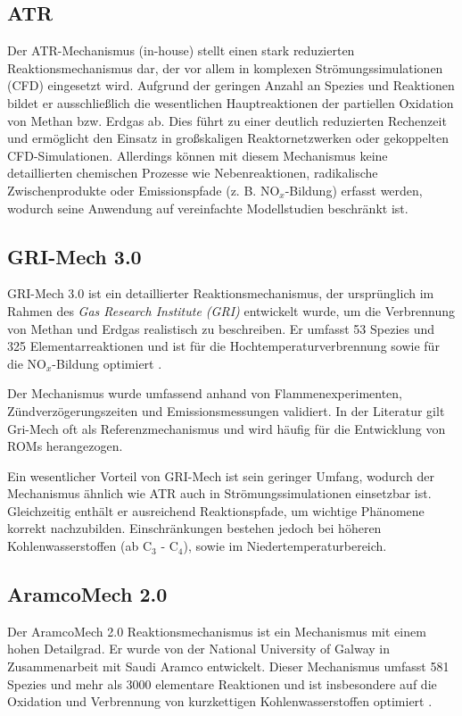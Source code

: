     \subsection*{ATR}
        Der ATR-Mechanismus (in-house) stellt einen stark reduzierten Reaktionsmechanismus dar, der vor allem in komplexen Strömungssimulationen (CFD) eingesetzt wird. Aufgrund der geringen Anzahl an Spezies und Reaktionen bildet er ausschließlich die wesent\-lichen Hauptreaktionen der partiellen Oxidation von Methan bzw. Erdgas ab. Dies führt zu einer deutlich reduzierten Rechenzeit und ermöglicht den Einsatz in großskaligen Reaktornetzwerken oder gekoppelten CFD-Simulationen. Allerdings können mit diesem Mechanismus keine detaillierten chemischen Prozesse wie Nebenreaktionen, radikalische Zwischenprodukte oder Emissionspfade (z. B. NO$_x$-Bildung) erfasst werden, wodurch seine Anwendung auf vereinfachte Modellstudien beschränkt ist.
    \subsection*{GRI-Mech 3.0}
        GRI-Mech 3.0 ist ein detaillierter Reaktionsmechanismus, der ursprünglich im Rahmen des \emph{Gas Research Institute (GRI)} entwickelt wurde, um die Verbrennung von Methan und Erdgas realistisch zu beschreiben. Er umfasst 53 Spezies und 325 Elementarreaktionen und ist für die Hochtemperaturverbrennung sowie für die NO$_x$-Bildung optimiert \cite{Gri-Mech}.

        Der Mechanismus wurde umfassend anhand von Flammenexperimenten, Zündverzögerungszeiten und Emissionsmessungen validiert. In der Literatur gilt Gri-Mech oft als Referenzmechanismus und wird häufig für die Entwicklung von ROMs herangezogen. 

        Ein wesentlicher Vorteil von GRI-Mech ist sein geringer Umfang, wodurch der Mechanismus ähnlich wie ATR auch in Strömungssimulationen einsetzbar ist. Gleichzeitig enthält er ausreichend Reaktionspfade, um wichtige Phänomene korrekt nachzubilden. Einschränkungen bestehen jedoch bei höheren Kohlenwasserstoffen (ab C$_3$ - C$_4$), sowie im Niedertemperaturbereich.
    \subsection*{AramcoMech 2.0}
        Der AramcoMech 2.0 Reaktionsmechanismus ist ein Mechanismus mit einem hohen Detailgrad. Er wurde von der National University of Galway in Zusammenarbeit mit Saudi Aramco entwickelt. Dieser Mechanismus umfasst 581 Spezies und mehr als 3000 elementare Reaktionen und ist insbesondere auf die Oxidation und Verbrennung von kurzkettigen Kohlenwasserstoffen optimiert \cite{Aramco20}. 


